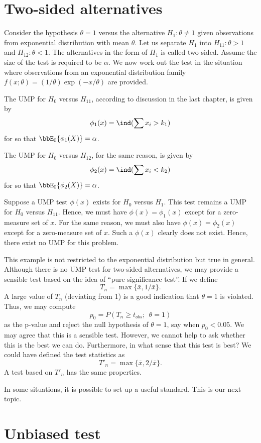 \section{Two-sided alternatives}
Consider the hypothesis $\theta = 1$ versus the alternative
$H_1: \theta \neq 1$ given observations from exponential
distribution with mean $\theta$.
Let us separate $H_1$ into $H_{11}: \theta > 1$ and $H_{12}: \theta < 1$.
The alternatives in the form of $H_1$ is called two-sided.
Assume the size of the test is required to be $\alpha$.
We now work out the test in the situation where \iid observations
from an exponential distribution family $f(x; \theta) = (1/\theta) \exp ( - x/\theta)$
are provided.

The UMP for $H_0$ versus $H_{11}$, according to discussion
in the last chapter, is given by
\[
\phi_1(x) = \ind ( \sum x_i > k_1)
\]
for so that $\bbE_0\{\phi_1(X) \} = \alpha$.

The UMP for $H_0$ versus $H_{12}$, for the same reason,
is given by
\[
\phi_2(x) = \ind ( \sum x_i < k_2)
\]
for so that $\bbE_0\{\phi_2(X) \} = \alpha$.

Suppose a UMP test $\phi(x)$ exists for $H_0$ versus $H_1$.
This test remains a UMP for $H_0$ versus $H_{11}$.
Hence, we must have $\phi(x) = \phi_1(x)$ except for
a zero-measure set of $x$.
For the same reason, we must also have $\phi(x) = \phi_2(x)$
except for a zero-measure set of $x$.
Such a $\phi(x)$ clearly does not exist. Hence,
there exist no UMP for this problem.

This example is not restricted to the exponential distribution but
true in general. Although there is no UMP test for two-sided
alternatives, we may provide a sensible test based on the idea 
of ``pure significance test''.
If we define 
\[
T_n = \max \{ \bar x, 1/\bar x\}.
\]
A large value of $T_n$ (deviating from 1) is a good indication
that $\theta=1$ is violated. Thus, we may compute
\[
p_0 = P( T_n \geq t_{obs} ;~~\theta=1)
\]
as the p-value and reject the null hypothesis of $\theta = 1$, 
say when $p_0 < 0.05$.
We may agree that this is a sensible test. However, we cannot
help to ask whether this is the best we can do.
Furthermore, in what sense that this test is best?
We could have defined the test statistics as
\[
T'_n = \max \{ \bar x, 2/\bar x\}.
\]
A test based on $T'_n$ has the same properties.

In some situations, it is possible to set up a useful standard.
This is our next topic.

\section{Unbiased test}


